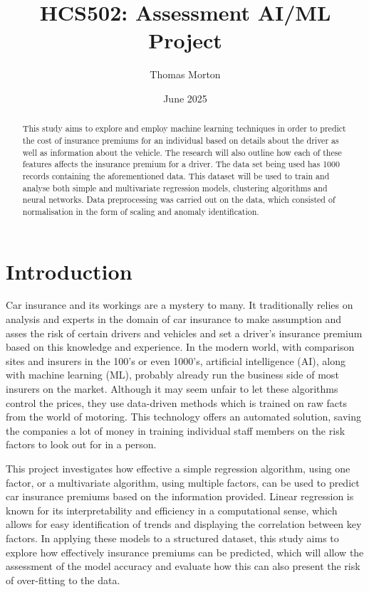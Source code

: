 \documentclass{article}
\title{HCS502: Assessment \- AI/ML Project \- 2310190}
\author{Thomas Morton}
\date{June 2025}
\begin{document}
\maketitle

\begin{abstract}
This study aims to explore and employ machine learning techniques in order to predict the cost of insurance premiums for an individual based on details about the driver as well as information about the vehicle. The research will also outline how each of these features affects the insurance premium for a driver. The data set being used has 1000 records containing the aforementioned data. This dataset will be used to train and analyse both simple and multivariate regression models, clustering algorithms and neural networks. Data preprocessing was carried out on the data, which consisted of normalisation in the form of scaling and anomaly identification.

\end{abstract}

\newpage

\section{Introduction}
Car insurance and its workings are a mystery to many. It traditionally relies on analysis and experts in the domain of car insurance to make assumption and asses the risk of certain drivers and vehicles and set a driver's insurance premium based on this knowledge and experience. In the modern world, with comparison sites and insurers in the 100's or even 1000's, artificial intelligence (AI), along with machine learning (ML), probably already run the business side of most insurers on the market. Although it may seem unfair to let these algorithms control the prices, they use data-driven methods which is trained on raw facts from the world of motoring. This technology offers an automated solution, saving the companies a lot of money in training individual staff members on the risk factors to look out for in a person. 

This project investigates how effective a simple regression algorithm, using one factor, or a multivariate algorithm, using multiple factors, can be used to predict car insurance premiums based on the information provided. Linear regression is known for its interpretability and efficiency in a computational sense\cite{scikit_LR}, which allows for easy identification of trends and displaying the correlation between key factors. In applying these models to a structured dataset, this study aims to explore how effectively insurance premiums can be predicted, which will allow the assessment of the model accuracy and evaluate how this can also present the risk of over-fitting to the data.
\end{document}
